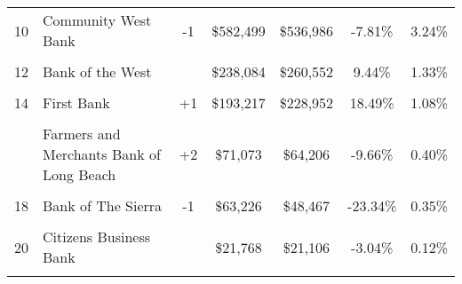 \begin{table}
\begin{tabular}{llccccc}
10 & Community West Bank & -1 & \$582,499 & \$536,986 & -7.81\% & 3.24\%\\
\addlinespace
\cellcolor{gray!6}{11} & \cellcolor{gray!6}{Community Bank of Santa Maria} & \cellcolor{gray!6}{} & \cellcolor{gray!6}{\$389,162} & \cellcolor{gray!6}{\$339,464} & \cellcolor{gray!6}{-12.77\%} & \cellcolor{gray!6}{2.17\%}\\
12 & Bank of the West &  & \$238,084 & \$260,552 & 9.44\% & 1.33\%\\
\cellcolor{gray!6}{13} & \cellcolor{gray!6}{Pacific Western Bank} & \cellcolor{gray!6}{+1} & \cellcolor{gray!6}{\$234,692} & \cellcolor{gray!6}{\$237,808} & \cellcolor{gray!6}{1.33\%} & \cellcolor{gray!6}{1.31\%}\\
14 & First Bank & +1 & \$193,217 & \$228,952 & 18.49\% & 1.08\%\\
\cellcolor{gray!6}{15} & \cellcolor{gray!6}{The Northern Trust Company} & \cellcolor{gray!6}{-2} & \cellcolor{gray!6}{\$189,360} & \cellcolor{gray!6}{\$179,156} & \cellcolor{gray!6}{-5.39\%} & \cellcolor{gray!6}{1.05\%}\\
\addlinespace
16 & Farmers and Merchants Bank of Long Beach & +2 & \$71,073 & \$64,206 & -9.66\% & 0.40\%\\
\cellcolor{gray!6}{17} & \cellcolor{gray!6}{U.S. Bank} & \cellcolor{gray!6}{-1} & \cellcolor{gray!6}{\$67,524} & \cellcolor{gray!6}{\$59,949} & \cellcolor{gray!6}{-11.22\%} & \cellcolor{gray!6}{0.38\%}\\
18 & Bank of The Sierra & -1 & \$63,226 & \$48,467 & -23.34\% & 0.35\%\\
\cellcolor{gray!6}{19} & \cellcolor{gray!6}{Banc of California} & \cellcolor{gray!6}{} & \cellcolor{gray!6}{\$50,684} & \cellcolor{gray!6}{\$47,199} & \cellcolor{gray!6}{-6.88\%} & \cellcolor{gray!6}{0.28\%}\\
20 & Citizens Business Bank &  & \$21,768 & \$21,106 & -3.04\% & 0.12\%\\
\addlinespace
\cellcolor{gray!6}{Totals} & \cellcolor{gray!6}{} & \cellcolor{gray!6}{} & \cellcolor{gray!6}{\$17,952,514} & \cellcolor{gray!6}{\$15,355,639} & \cellcolor{gray!6}{-14.47\%} & \cellcolor{gray!6}{100.0\%}\\
\bottomrule
\end{tabular}
\end{table}
